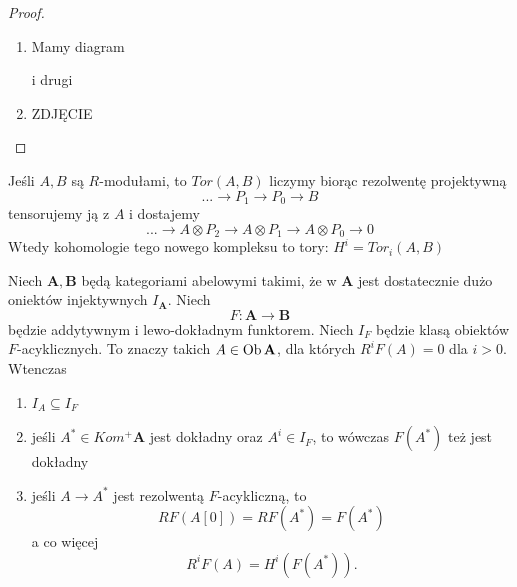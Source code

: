 \begin{proof}
\begin{enumerate}
    \item Mamy diagram
      \begin{center}\end{center}
      i drugi
      \begin{center}\end{center}
    \item 
      \begin{center}\end{center}
      {\large\color{red}ZDJĘCIE}
  \end{enumerate}
\end{proof}

Jeśli $A, B$ są $R$-modułami, to $Tor(A, B)$ liczymy biorąc rezolwentę projektywną
$$...\to P_1\to P_0\to B$$ 
tensorujemy ją z $A$ i dostajemy
$$...\to A\otimes P_2\to A\otimes P_1\to A\otimes P_0\to 0$$
Wtedy kohomologie tego nowego kompleksu to tory: $H^i=Tor_i(A, B)$
  
\begin{theorem}
  Niech $\mathbf{A},\mathbf{B}$ będą kategoriami abelowymi takimi, że w $\mathbf{A}$ jest dostatecznie dużo oniektów injektywnych $I_\mathbf{A}$. Niech 
  $$F:\mathbf{A}\to \mathbf{B}$$
  będzie addytywnym i lewo-dokładnym funktorem. Niech $I_F$ będzie klasą obiektów $F$-acyklicznych. To znaczy takich $A\in\operatorname{Ob}\mathbf{A}$, dla których $R^iF(A)=0$ dla $i>0$. Wtenczas
  \begin{enumerate} 
    \item $I_A\subseteq I_F$
    \item jeśli $A^*\in Kom^+\mathbf{A}$ jest dokładny oraz $A^i\in I_F$, to wówczas $F(A^*)$ też jest dokładny
    \item jeśli $A\to A^*$ jest rezolwentą $F$-acykliczną, to 
      $$RF(A[0])=RF(A^*)=F(A^*)$$
      a co więcej
      $$R^iF(A)=H^i(F(A^*)).$$
  \end{enumerate}
\end{theorem}

